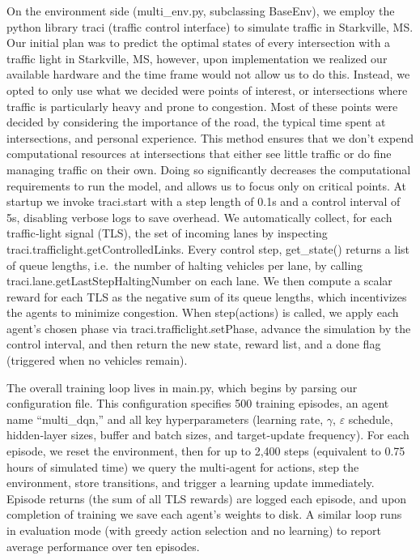 \documentclass[conference]{IEEEtran}
\begin{document}
On the environment side (multi\_env.py, subclassing BaseEnv), we employ the python library traci (traffic control interface) to simulate traffic in Starkville, MS. Our initial plan was to predict the optimal states of every intersection with a traffic light in Starkville, MS, however, upon implementation we realized our available hardware and the time frame would not allow us to do this. Instead, we opted to only use what we decided were points of interest, or intersections where traffic is particularly heavy and prone to congestion. Most of these points were decided by considering the importance of the road, the typical time spent at intersections, and personal experience. This method ensures that we don't expend computational resources at intersections that either see little traffic or do fine managing traffic on their own. Doing so significantly decreases the computational requirements to run the model, and allows us to focus only on critical points. At startup we invoke traci.start with a step length of 0.1s and a control interval of 5s, disabling verbose logs to save overhead. We automatically collect, for each traffic‐light signal (TLS), the set of incoming lanes by inspecting traci.trafficlight.getControlledLinks. Every control step, get\_state() returns a list of queue lengths, i.e.\ the number of halting vehicles per lane, by calling traci.lane.getLastStepHaltingNumber on each lane. We then compute a scalar reward for each TLS as the negative sum of its queue lengths, which incentivizes the agents to minimize congestion. When step(actions) is called, we apply each agent’s chosen phase via traci.trafficlight.setPhase, advance the simulation by the control interval, and then return the new state, reward list, and a done flag (triggered when no vehicles remain).

The overall training loop lives in main.py, which begins by parsing our configuration file. This configuration specifies 500 training episodes, an agent name ``multi\_dqn,'' and all key hyperparameters (learning rate, $\gamma$, $\varepsilon$ schedule, hidden‐layer sizes, buffer and batch sizes, and target‐update frequency). For each episode, we reset the environment, then for up to 2,400 steps (equivalent to 0.75 hours of simulated time) we query the multi‐agent for actions, step the environment, store transitions, and trigger a learning update immediately. Episode returns (the sum of all TLS rewards) are logged each episode, and upon completion of training we save each agent’s weights to disk. A similar loop runs in evaluation mode (with greedy action selection and no learning) to report average performance over ten episodes.
\end{document}
